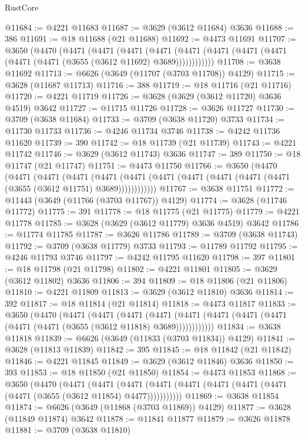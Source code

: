 \begin{lexlean}{RustCore}
\begin{coremodule}
@11684 := @4221 @11683
@11687 := @3629 (@3612 @11684) @3636
@11688 := 386
@11691 := @18 @11688 (@21 @11688)
@11692 := @4473 @11691
@11707 := @3650
    (@4470
      (@4471
        (@4471
          (@4471
            (@4471 (@4471 (@4471 (@4471 (@4471 (@4471 (@4471 (@3655 (@3612 @11692) @3689))))))))))))
@11708 := @3638 @11692
@11713 := @6626 (@3649 (@11707 (@3703 @11708)) @4129)
@11715 := @3628 (@11687 @11713)
@11716 := 388
@11719 := @18 @11716 (@21 @11716)
@11720 := @4221 @11719
@11726 := @3628 (@3629 (@3612 @11720) @3636 @4519) @3642
@11727 := @11715 @11726
@11728 := @3626 @11727
@11730 := @3709 (@3638 @11684)
@11733 := @3709 (@3638 @11720) @3733
@11734 := @11730 @11733
@11736 := @4246 @11734 @3746
@11738 := @4242 @11736 @11620
@11739 := 390
@11742 := @18 @11739 (@21 @11739)
@11743 := @4221 @11742
@11746 := @3629 (@3612 @11743) @3636
@11747 := 389
@11750 := @18 @11747 (@21 @11747)
@11751 := @4473 @11750
@11766 := @3650
    (@4470
      (@4471
        (@4471
          (@4471
            (@4471 (@4471 (@4471 (@4471 (@4471 (@4471 (@4471 (@3655 (@3612 @11751) @3689))))))))))))
@11767 := @3638 @11751
@11772 := @11443 (@3649 (@11766 (@3703 @11767)) @4129)
@11774 := @3628 (@11746 @11772)
@11775 := 391
@11778 := @18 @11775 (@21 @11775)
@11779 := @4221 @11778
@11785 := @3628 (@3629 (@3612 @11779) @3636 @4519) @3642
@11786 := @11774 @11785
@11787 := @3626 @11786
@11789 := @3709 (@3638 @11743)
@11792 := @3709 (@3638 @11779) @3733
@11793 := @11789 @11792
@11795 := @4246 @11793 @3746
@11797 := @4242 @11795 @11620
@11798 := 397
@11801 := @18 @11798 (@21 @11798)
@11802 := @4221 @11801
@11805 := @3629 (@3612 @11802) @3636
@11806 := 394
@11809 := @18 @11806 (@21 @11806)
@11810 := @4221 @11809
@11813 := @3629 (@3612 @11810) @3636
@11814 := 392
@11817 := @18 @11814 (@21 @11814)
@11818 := @4473 @11817
@11833 := @3650
    (@4470
      (@4471
        (@4471
          (@4471
            (@4471 (@4471 (@4471 (@4471 (@4471 (@4471 (@4471 (@3655 (@3612 @11818) @3689))))))))))))
@11834 := @3638 @11818
@11839 := @6626 (@3649 (@11833 (@3703 @11834)) @4129)
@11841 := @3628 (@11813 @11839)
@11842 := 395
@11845 := @18 @11842 (@21 @11842)
@11846 := @4221 @11845
@11849 := @3629 (@3612 @11846) @3636
@11850 := 393
@11853 := @18 @11850 (@21 @11850)
@11854 := @4473 @11853
@11868 := @3650
    (@4470
      (@4471
        (@4471
          (@4471 (@4471 (@4471 (@4471 (@4471 (@4471 (@4471 (@3655 (@3612 @11854) @4477)))))))))))
@11869 := @3638 @11854
@11874 := @6626 (@3649 (@11868 (@3703 @11869)) @4129)
@11877 := @3628 (@11849 @11874) @3642
@11878 := @11841 @11877
@11879 := @3626 @11878
@11881 := @3709 (@3638 @11810)

\end{coremodule}
\end{lexlean}
